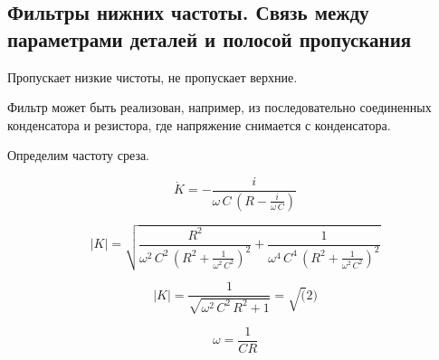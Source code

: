 \subsection{Фильтры нижних частоты. Связь между параметрами деталей и полосой пропускания }


Пропускает низкие чистоты, не пропускает верхние.

Фильтр может быть реализован, например, из последовательно соединенных конденсатора и резистора, где напряжение снимается с конденсатора.

Определим частоту среза.


\begin{equation}
\dot K = -\frac{i}{\omega\,C\,\left( R-\frac{i}{\omega\,C}\right) }
\end{equation}

\begin{equation}
|K| = \sqrt{\frac{{R}^{2}}{{\omega}^{2}\,{C}^{2}\,{\left( {R}^{2}+\frac{1}{{\omega}^{2}\,{C}^{2}}\right) }^{2}}+\frac{1}{{\omega}^{4}\,{C}^{4}\,{\left( {R}^{2}+\frac{1}{{\omega}^{2}\,{C}^{2}}\right) }^{2}}}
\end{equation}


\begin{equation}
|K|=\frac{1}{\sqrt{{\omega}^{2}\,{C}^{2}\,{R}^{2}+1}} = \sqrt(2)
\end{equation}

\begin{equation}
\omega = \frac{1}{C R}
\end{equation}


\pagebreak